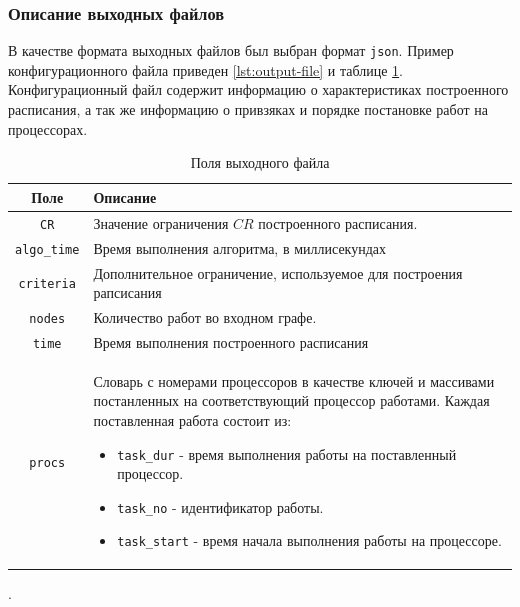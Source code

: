 \subsubsection{Описание выходных файлов}
В качестве формата выходных файлов был выбран формат \texttt{json}. Пример конфигурационного файла приведен \ref{lst:output-file} и таблице \ref{tbl:output-file-fields}. Конфигурационный файл содержит информацию о характеристиках построенного расписания, а так же информацию о привзяках и порядке постановке работ на процессорах.
\begin{table}[!htbp]
    \centering
    \begin{tabularx}{\textwidth}{|c|X|}
        \hline
        Поле                & Описание                                                                                                                                                \\
        \hline
        \texttt{CR}         & Значение ограничения $CR$ построенного расписания.                                                                                                      \\
        \hline
        \texttt{algo\_time} & Время выполнения алгоритма, в миллисекундах                                                                                                             \\
        \hline
        \texttt{criteria}   & Дополнительное ограничение, используемое для построения рапсисания                                                                                      \\
        \hline
        \texttt{nodes}      & Количество работ во входном графе.                                                                                                                      \\
        \hline
        \texttt{time}       & Время выполнения построенного расписания                                                                                                                \\
        \hline
        \texttt{procs}      & Словарь с номерами процессоров в качестве ключей и массивами постанленных на соответствующий процессор работами. Каждая поставленная работа состоит из:
        \begin{itemize}
            \item \texttt{task\_dur} - время выполнения работы на поставленный процессор.
            \item \texttt{task\_no} - идентификатор работы.
            \item \texttt{task\_start} - время начала выполнения работы на процессоре.
        \end{itemize}                                                                                                  \\
        \hline
    \end{tabularx}
    \caption{Поля выходного файла}.
    \label{tbl:output-file-fields}
\end{table}

